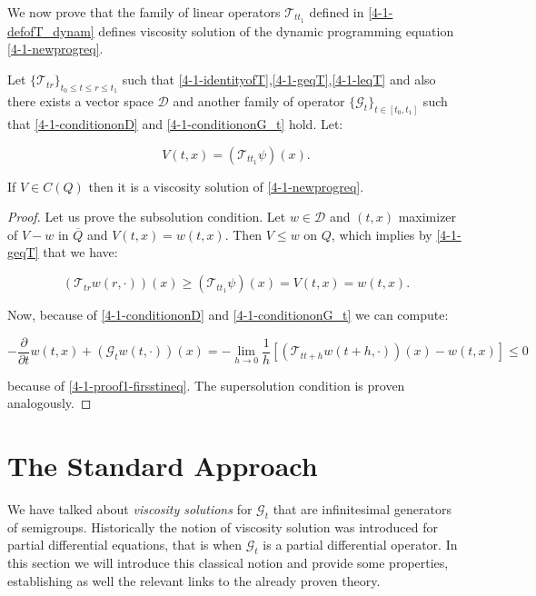 We now prove that the family of linear operators $\mathcal{T}_{tt_1}$ defined in \ref{4-1-defofT_dynam} defines viscosity solution of the dynamic programming 
equation \ref{4-1-newprogreq}.

\begin{theorem}\label{4-1-thm:Vtoviscosity}
    Let $\{\mathcal{T}_{tr}\}_{t_0\leq t\leq r\leq t_1}$ such that \ref{4-1-identityofT},\ref{4-1-geqT},\ref{4-1-leqT} and also there exists a vector space 
    $\mathcal{D}$ and another family of operator $\{\mathcal{G}_t\}_{t\in[t_0,t_1]}$ such that \ref{4-1-conditiononD} and \ref{4-1-conditiononG_t} hold. Let:
    
    \[V(t,x)=\left(\mathcal{T}_{tt_1}\psi\right)(x).\]

    If $V\in C(Q)$ then it is a viscosity solution of \ref{4-1-newprogreq}.

    \begin{proof}
        Let us prove the subsolution condition. Let $w\in\mathcal{D}$ and $(t,x)$ maximizer of $V-w$ in $\overline{Q}$ and $V(t,x)=w(t,x)$. Then $V\leq w$ on 
        $Q$, which implies by \ref{4-1-geqT} that we have:
        
        \begin{equation}\label{4-1-proof1-firsstineq}(\mathcal{T}_{tr}w(r,\cdot))(x) \geq (\mathcal{T}_{tt_1}\psi)(x) = V(t,x) = w(t,x).\end{equation}

        Now, because of \ref{4-1-conditiononD} and \ref{4-1-conditiononG_t} we can compute:
        
        \[-\frac{\partial}{\partial t}w(t,x) + (\mathcal{G}_tw(t,\cdot))(x) = - \lim_{h\to0} \frac{1}{h}\left[(\mathcal{T}_{tt+h}w(t+h,\cdot))(x)-w(t,x)\right]\leq0\]

        because of \ref{4-1-proof1-firsstineq}. The supersolution condition is proven analogously.
    \end{proof}
\end{theorem}

\section{The Standard Approach}

We have talked about \textit{viscosity solutions} for $\mathcal{G}_t$ that are infinitesimal generators of semigroups. Historically the notion of viscosity solution was introduced 
for partial differential equations, that is when $\mathcal{G}_t$ is a partial differential operator. In this section we will introduce this classical notion and provide some properties, 
establishing as well the relevant links to the already proven theory. 

